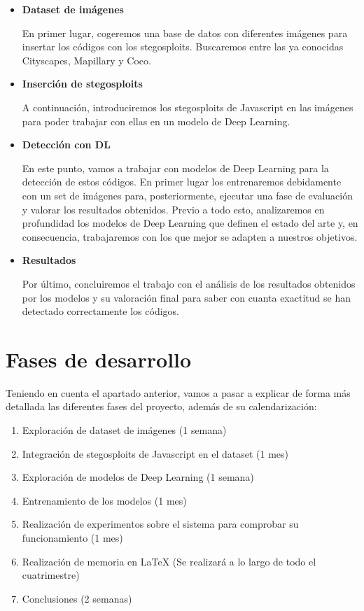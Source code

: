 \documentclass[12pt,oneside,a4paper]{article}
\begin{document}
\begin{itemize}
	\item \textbf{Dataset de imágenes}
	
	En primer lugar, cogeremos una base de datos con diferentes imágenes para insertar los códigos con los stegosploits. Buscaremos entre las ya conocidas Cityscapes, Mapillary y Coco. \cite{cityscapes} \cite{mapillary} \cite{coco}
	\item \textbf{Inserción de stegosploits}
	
	A continuación, introduciremos los stegosploits de Javascript en las imágenes para poder trabajar con ellas en un modelo de Deep Learning.
	\item \textbf{Detección con DL}
	
	En este punto, vamos a trabajar con modelos de Deep Learning para la detección de estos códigos. En primer lugar los entrenaremos debidamente con un set de imágenes para, posteriormente, ejecutar una fase de evaluación y valorar los resultados obtenidos. Previo a todo esto, analizaremos en profundidad los modelos de Deep Learning que definen el estado del arte y, en consecuencia, trabajaremos con los que mejor se adapten a nuestros objetivos.
	\item \textbf{Resultados}
	
	Por último, concluiremos el trabajo con el análisis de los resultados obtenidos por los modelos y su valoración final para saber con cuanta exactitud se han detectado correctamente los códigos.
\end{itemize}

\section{Fases de desarrollo}

Teniendo en cuenta el apartado anterior, vamos a pasar a explicar de forma más detallada las diferentes fases del proyecto, además de su calendarización:

\begin{enumerate}
 \item Exploración de dataset de imágenes (1 semana)
 \item Integración de stegosploits de Javascript en el dataset (1 mes)
 \item Exploración de modelos de Deep Learning (1 semana)
 \item Entrenamiento de los modelos (1 mes)
 \item Realización de experimentos sobre el sistema para comprobar su funcionamiento (1 mes)
 \item Realización de memoria en LaTeX (Se realizará a lo largo de todo el cuatrimestre)
 \item Conclusiones (2 semanas)
\end{enumerate}
\end{document}
